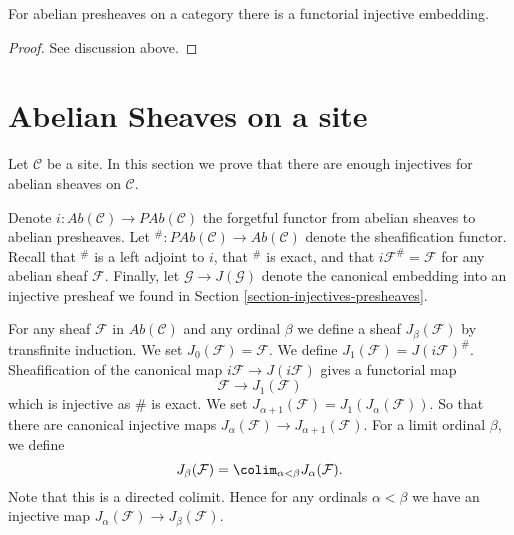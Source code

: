 \begin{proposition}
\label{proposition-presheaves-injectives}
For abelian presheaves on a category there is a functorial injective
embedding.
\end{proposition}

\begin{proof}
See discussion above.
\end{proof}












\section{Abelian Sheaves on a site}
\label{section-injectives-sheaves}

\noindent
Let $\mathcal{C}$ be a site. In this section we prove that there are
enough injectives for abelian sheaves on $\mathcal{C}$.

\medskip\noindent
Denote
$i : \textit{Ab}(\mathcal{C}) \longrightarrow \textit{PAb}(\mathcal{C})$
the forgetful functor from abelian sheaves to abelian presheaves.
Let
${}^\# : \textit{PAb}(\mathcal{C}) \longrightarrow \textit{Ab}(\mathcal{C})$
denote the sheafification functor. Recall that ${}^\#$ is a left adjoint
to $i$, that ${}^\#$ is exact, and that $i\mathcal{F}^\# = \mathcal{F}$
for any abelian sheaf $\mathcal{F}$. Finally, let
$\mathcal{G} \to J(\mathcal{G})$ denote the canonical
embedding into an injective presheaf we found in
Section \ref{section-injectives-presheaves}.

\medskip\noindent
For any sheaf $\mathcal{F}$ in $\textit{Ab}(\mathcal{C})$ and
any ordinal $\beta$ we define a sheaf
$J_\beta(\mathcal{F})$ by transfinite induction.
We set $J_0(\mathcal{F}) = \mathcal{F}$.
We define $J_1(\mathcal{F}) = J(i\mathcal{F})^\#$.
Sheafification of the canonical map $i\mathcal{F} \to J(i\mathcal{F})$
gives a functorial map
$$
\mathcal{F} \longrightarrow J_1(\mathcal{F})
$$
which is injective as $\#$ is exact. We set
$J_{\alpha + 1}(\mathcal{F}) = J_1(J_\alpha(\mathcal{F}))$.
So that there are canonical injective maps
$J_\alpha(\mathcal{F}) \to J_{\alpha + 1}(\mathcal{F})$.
For a limit ordinal $\beta$, we define
$$
J_\beta(\mathcal{F}) = \colim_{\alpha < \beta} J_\alpha(\mathcal{F}).
$$
Note that this is a directed colimit. Hence for any ordinals $\alpha < \beta$
we have an injective map $J_\alpha(\mathcal{F}) \to J_\beta(\mathcal{F})$.

